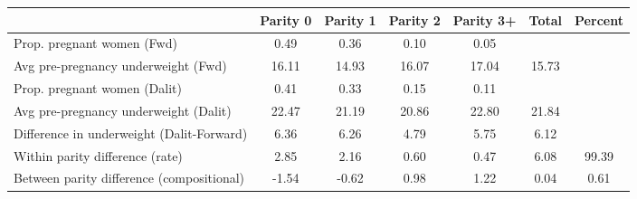 \begin{tabular}{l*{6}{c}}
\toprule
            &\multicolumn{1}{c}{Parity 0}&\multicolumn{1}{c}{Parity 1}&\multicolumn{1}{c}{Parity 2}&\multicolumn{1}{c}{Parity 3+}&\multicolumn{1}{c}{Total}&\multicolumn{1}{c}{Percent}\\
\midrule
\midrule
Prop. pregnant women (Fwd)&        0.49&        0.36&        0.10&        0.05&            &            \\
Avg pre-pregnancy underweight (Fwd)&       16.11&       14.93&       16.07&       17.04&       15.73&            \\
Prop. pregnant women (Dalit)&        0.41&        0.33&        0.15&        0.11&            &            \\
Avg pre-pregnancy underweight (Dalit)&       22.47&       21.19&       20.86&       22.80&       21.84&            \\
Difference in underweight (Dalit-Forward)&        6.36&        6.26&        4.79&        5.75&        6.12&            \\
Within parity difference (rate)&        2.85&        2.16&        0.60&        0.47&        6.08&       99.39\\
Between parity difference (compositional)&       -1.54&       -0.62&        0.98&        1.22&        0.04&        0.61\\
\bottomrule
\end{tabular}
